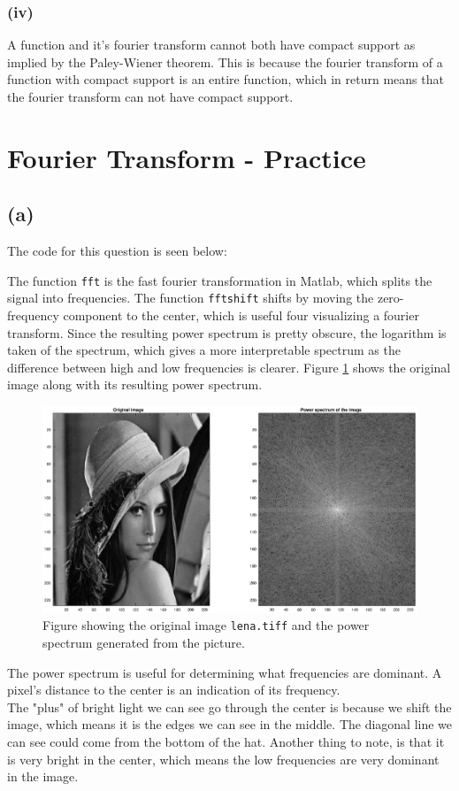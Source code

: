 \documentclass[a4paper]{article}
\begin{document}
\subsubsection{(iv)}
A function and it's fourier transform cannot both have compact support as implied by the Paley-Wiener theorem. This is because the fourier transform of a function with compact support is an entire function, which in return means that the fourier transform can not have compact support.

\section{Fourier Transform - Practice}
\subsection{(a)}
The code for this question is seen below:

The function \texttt{fft} is the fast fourier transformation in Matlab, which splits the signal into frequencies. The function \texttt{fftshift} shifts by moving the zero-frequency component to the center, which is useful four visualizing a fourier transform. Since the resulting power spectrum is pretty obscure, the logarithm is taken of the spectrum, which gives a more interpretable spectrum as the difference between high and low frequencies is clearer. Figure \ref{fig1} shows the original image along with its resulting power spectrum.
\begin{figure}[H]
  \centering
  \captionsetup{justification=centering}
  \includegraphics[width=\textwidth]{fig1.eps}
  \caption{Figure showing the original image \texttt{lena.tiff} and the power spectrum generated from the picture.}
  \label{fig1}
\end{figure}
The power spectrum is useful for determining what frequencies are dominant. A pixel's distance to the center is an indication of its frequency. \\
The "plus" of bright light we can see go through the center is because we shift the image, which means it is the edges we can see in the middle. The diagonal line we can see could come from the bottom of the hat. Another thing to note, is that it is very bright in the center, which means the low frequencies are very dominant in the image.
\end{document}
